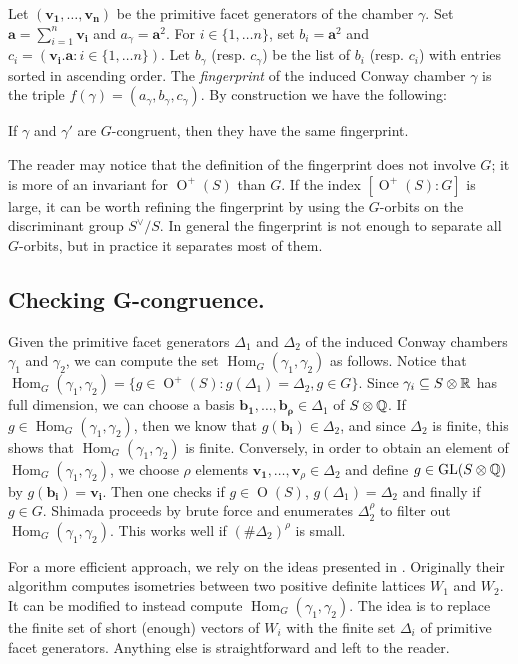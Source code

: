 \documentclass[11pt,letterpaper]{amsart}
\newcommand{\vect}[1]{\boldsymbol{#1}}
\DeclareMathOperator{\Hom}{Hom}
\DeclareMathOperator{\GL}{GL}
\DeclareMathOperator{\Or}{O}
\begin{document}
Let $(\vect{v_1}, \dots, \vect{v_n}) $ be the primitive facet generators of the chamber $\gamma$. 
Set $\vect{a}=\sum_{i=1}^n\vect{v_i}$ and $a_\gamma = \vect{a}^2$. For $i \in \{1,\dots n\}$, set $b_i =\vect{a}^2$ and
$c_i = (\vect{v_i}.\vect{a} : i \in \{1,\dots n\})$. 
Let $b_\gamma$ (resp. $c_\gamma$) 
be the list of $b_i$ (resp. $c_i$) with entries sorted in ascending order. 
The \emph{fingerprint} of the induced Conway chamber $\gamma$ is the triple $f(\gamma) = (a_\gamma, b_\gamma, c_\gamma)$. 
By construction we have the following:

\begin{proposition}  
If $\gamma$ and $\gamma'$ are $G$-congruent, then they have the same fingerprint. 
\end{proposition}

The reader may notice that the definition of the fingerprint does not involve $G$; it is more of an invariant for $\Or^+(S)$ than $G$.
If the index $[\Or^+(S):G]$ is large, it can be worth refining the fingerprint by using the $G$-orbits on the discriminant group $S^\vee/S$.
In general the fingerprint is not enough to separate all $G$-orbits, but in practice it separates most of them. 

\subsection{Checking G-congruence.}
Given the primitive facet generators $\Delta_1$ and $\Delta_2$ of the induced Conway chambers $\gamma_1$ and $\gamma_2$, we can compute the set 
$\Hom_G(\gamma_1,\gamma_2)$ as follows.
Notice that $\Hom_G(\gamma_1, \gamma_2) =\{g \in \Or^+(S) : g(\Delta_1) = \Delta_2, g\in G\}$. Since $\gamma_i \subseteq S \otimes \mathbb{R}$ has full dimension, we can choose a basis $\vect{b_1}, \dots, \vect{b_\rho} \in \Delta_1$ of $S\otimes \mathbb{Q}$. 
If $g\in \Hom_G(\gamma_1,\gamma_2)$, then we know that $g(\vect{b_i}) \in \Delta_2$, and since $\Delta_2$ is finite, this shows that $\Hom_G(\gamma_1,\gamma_2)$ is finite.
Conversely, in order to obtain an element of $\Hom_G(\gamma_1, \gamma_2)$, we choose $\rho$ elements $\vect{v_1},\dots, \vect{v}_\rho \in \Delta_2$ and define $g \in \GL(S \otimes \QQ)$ by $g(\vect{b_i})=\vect{v_i}$.  
Then one checks if $g \in \Or(S)$, $g(\Delta_1) = \Delta_2$ and finally if $g \in G$.
Shimada proceeds by brute force and enumerates $\Delta_2^\rho$ to filter out $\Hom_G(\gamma_1,\gamma_2)$. This works well if $(\#\Delta_2)^\rho$ is small. 

For a more efficient approach, we rely on the ideas presented in \cite{plesken.souvignier}. Originally their algorithm computes isometries between two positive definite lattices $W_1$ and $W_2$. 
It can be modified to instead compute  $\Hom_G(\gamma_1,\gamma_2)$. The idea is to replace the finite set of short (enough) vectors of $W_i$ with the finite set $\Delta_i$ of primitive facet generators. 
Anything else is straightforward and left to the reader. 
\end{document}
